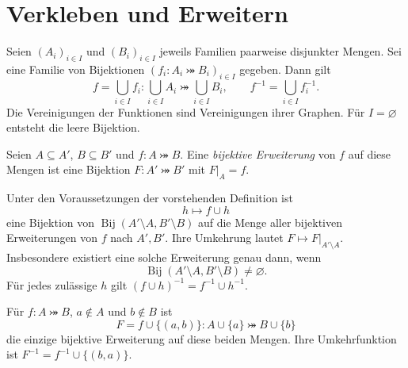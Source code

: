 \section{Verkleben und Erweitern}

\begin{theorem}
\label{b08guide:thm:gluing}
Seien $(A_i)_{i\in I}$ und $(B_i)_{i\in I}$ jeweils Familien
paarweise disjunkter Mengen. Sei eine Familie von Bijektionen
$(f_i\colon A_i\bij B_i)_{i\in I}$ gegeben. Dann gilt
\[
 f=\bigcup_{i\in I}f_i\colon
 \bigcup_{i\in I}A_i\bij\bigcup_{i\in I}B_i,
 \qquad f^{-1}=\bigcup_{i\in I}f_i^{-1}.
\]
Die Vereinigungen der Funktionen sind Vereinigungen ihrer Graphen.
Für $I=\varnothing$ entsteht die leere Bijektion.
\end{theorem}

\begin{definition}
Seien $A\subseteq A'$, $B\subseteq B'$ und $f\colon A\bij B$.
Eine \emph{bijektive Erweiterung} von $f$ auf diese Mengen ist eine
Bijektion $F\colon A'\bij B'$ mit $F|_A=f$.
\end{definition}

\begin{theorem}
\label{b08guide:thm:extensions}
Unter den Voraussetzungen der vorstehenden Definition ist
\[
 h\longmapsto f\cup h
\]
eine Bijektion von $\operatorname{Bij}(A'\setminus A,B'\setminus B)$
auf die Menge aller bijektiven Erweiterungen von $f$ nach $A',B'$.
Ihre Umkehrung lautet $F\mapsto F|_{A'\setminus A}$.
Insbesondere existiert eine solche Erweiterung genau dann, wenn
\[
 \operatorname{Bij}(A'\setminus A,B'\setminus B)\ne\varnothing.
\]
Für jedes zulässige $h$ gilt $(f\cup h)^{-1}=f^{-1}\cup h^{-1}$.
\end{theorem}

\begin{theorem}
\label{b08guide:thm:freshpair}
Für $f\colon A\bij B$, $a\notin A$ und $b\notin B$ ist
\[
 F=f\cup\{(a,b)\}\colon A\cup\{a\}\bij B\cup\{b\}
\]
die einzige bijektive Erweiterung auf diese beiden Mengen.
Ihre Umkehrfunktion ist $F^{-1}=f^{-1}\cup\{(b,a)\}$.
\end{theorem}

